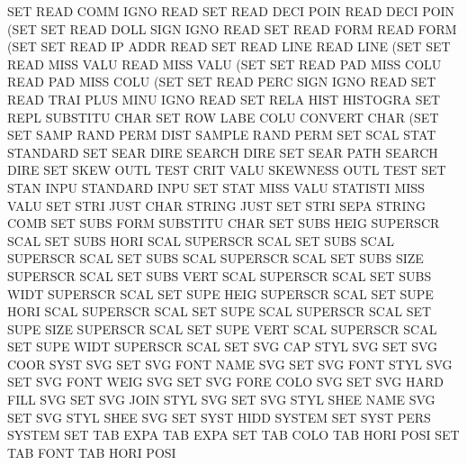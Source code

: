SET      READ COMM IGNO                 READ
SET      READ DECI POIN                 READ     DECI POIN (SET
SET      READ DOLL SIGN IGNO            READ
SET      READ FORM                      READ     FORM (SET
SET      READ IP   ADDR                 READ
SET      READ LINE                      READ     LINE (SET
SET      READ MISS VALU                 READ     MISS VALU (SET
SET      READ PAD  MISS COLU            READ     PAD  MISS COLU (SET
SET      READ PERC SIGN IGNO            READ
SET      READ TRAI PLUS MINU IGNO       READ
SET      RELA HIST                      HISTOGRA
SET      REPL                           SUBSTITU CHAR
SET      ROW  LABE COLU                 CONVERT  CHAR (SET
SET      SAMP RAND PERM DIST            SAMPLE   RAND PERM
SET      SCAL STAT                      STANDARD
SET      SEAR DIRE                      SEARCH   DIRE
SET      SEAR PATH                      SEARCH   DIRE
SET      SKEW OUTL TEST CRIT VALU       SKEWNESS OUTL TEST
SET      STAN INPU                      STANDARD INPU
SET      STAT MISS VALU                 STATISTI MISS VALU
SET      STRI JUST CHAR                 STRING   JUST
SET      STRI SEPA                      STRING   COMB
SET      SUBS FORM                      SUBSTITU CHAR
SET      SUBS HEIG                      SUPERSCR SCAL
SET      SUBS HORI SCAL                 SUPERSCR SCAL
SET      SUBS SCAL                      SUPERSCR SCAL
SET      SUBS SCAL                      SUPERSCR SCAL
SET      SUBS SIZE                      SUPERSCR SCAL
SET      SUBS VERT SCAL                 SUPERSCR SCAL
SET      SUBS WIDT                      SUPERSCR SCAL
SET      SUPE HEIG                      SUPERSCR SCAL
SET      SUPE HORI SCAL                 SUPERSCR SCAL
SET      SUPE SCAL                      SUPERSCR SCAL
SET      SUPE SIZE                      SUPERSCR SCAL
SET      SUPE VERT SCAL                 SUPERSCR SCAL
SET      SUPE WIDT                      SUPERSCR SCAL
SET      SVG  CAP  STYL                 SVG
SET      SVG  COOR SYST                 SVG
SET      SVG  FONT NAME                 SVG
SET      SVG  FONT STYL                 SVG
SET      SVG  FONT WEIG                 SVG
SET      SVG  FORE COLO                 SVG
SET      SVG  HARD FILL                 SVG
SET      SVG  JOIN STYL                 SVG
SET      SVG  STYL SHEE NAME            SVG
SET      SVG  STYL SHEE                 SVG
SET      SYST HIDD                      SYSTEM
SET      SYST PERS                      SYSTEM
SET      TAB  EXPA                      TAB      EXPA
SET      TAB  COLO                      TAB HORI POSI
SET      TAB  FONT                      TAB HORI POSI
